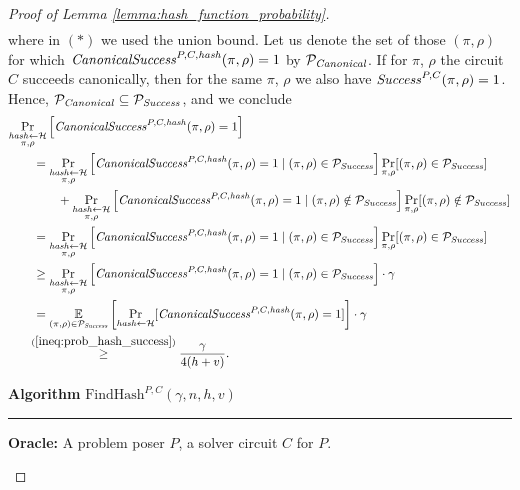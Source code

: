 \begin{proof}[Proof of Lemma \ref{lemma:hash_function_probability}]
\begin{align}
\end{align}
where in $(*)$ we used the union bound.
Let us denote the set of those $(\pi,\rho)$ for which $\operatorname{\mathit{CanonicalSuccess}}^{P, C, \operatorname{\mathit{hash}}}(\pi, \rho) = 1$ by $\mathcal{P}_{\mathit{Canonical}}$.
If for $\pi$, $\rho$ the circuit $C$ succeeds canonically, then for the same $\pi$, $\rho$ we also have $\operatorname{\mathit{Success}}^{P, C}(\pi, \rho) = 1$.
Hence, $\mathcal{P}_{\mathit{Canonical}} \subseteq \mathcal{P}_{\mathit{Success}}$, and we conclude
\begin{align}
  \label{ineq:hash_high_prob}
&\underset{\substack{\hash \leftarrow \cH \\ \pi, \rho}}{\Pr}\left[\CanonicalSuccess^{P, C, \hash}(\pi, \rho) = 1\right] \notag\\
&\IndI = \underset{\substack{\hash \leftarrow \cH \\ \pi, \rho}}{\Pr}\left[\CanonicalSuccess^{P,C,\hash}(\pi, \rho) = 1 \mid (\pi, \rho) \in \cP_{\mathit{Success}}\right]
\underset{\pi, \rho}{\Pr}[(\pi, \rho) \in \cP_{\mathit{Success}}] \notag\\
&\IndII + \underset{\substack{\hash \leftarrow \cH \\ \pi, \rho}}{\Pr}\left[\CanonicalSuccess^{P,C,\hash}(\pi, \rho) = 1 \mid (\pi, \rho) \notin \cP_{\mathit{Success}} \right]
\underset{\pi, \rho}{\Pr}[(\pi, \rho) \notin \cP_{\mathit{Success}}] \notag\\
%
&\IndI = \underset{\substack{\hash \leftarrow \cH \\ \pi, \rho}}{\Pr}\left[\CanonicalSuccess^{P,C,\hash}(\pi, \rho) = 1 \mid (\pi, \rho) \in \cP_{\mathit{Success}}\right]
\underset{\pi, \rho}{\Pr}[(\pi, \rho) \in \cP_{\mathit{Success}}] \notag\\
%
&\IndI \geq
\underset{\substack{\hash \leftarrow \cH \\ \pi, \rho}}{\Pr}\left[\CanonicalSuccess^{P,C,\hash}(\pi, \rho) = 1 \mid (\pi, \rho) \in \cP_{\mathit{Success}}\right] \cdot \gamma \notag\\
&\IndI =
\underset{(\pi, \rho) \in \cP_{\mathit{Success}}}
{\mathbb{E}}\left[\underset{\hash \leftarrow \cH}{\Pr}[\CanonicalSuccess^{P,C,\hash}(\pi, \rho) = 1] \right] \cdot \gamma \notag\\
&\hphantom{aaa}\stackrel{(\ref{ineq:prob_hash_success})}{\geq} \frac{\gamma}{4(h+v)}. %
\end{align}
%
\begin{codeblock}
  \textbf{Algorithm} $\text{FindHash}^{P,C}(\gamma, n, h, v)$
  \medskip\hrule
  \textbf{Oracle:} A problem poser $P$, a solver circuit $C$ for $P$.\\

\end{codeblock}
\end{proof}
